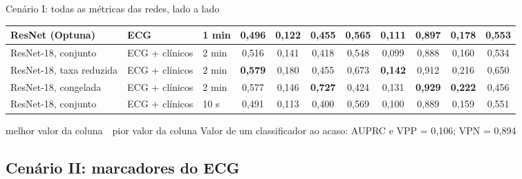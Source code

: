 \documentclass[10pt,aspectratio=169]{beamer}
\begin{document}
\begin{frame}{Cenário I: todas as métricas das redes, lado a lado}
{\begin{tabular}{lllcccccccc}
      ResNet (Optuna) & ECG & 1 min & 0,496 & 0,122 & 0,455 & 0,565 & 0,111 & 0,897 & 0,178 & 0,553 \\
      \midrule
      ResNet-18, conjunto & ECG + clínicos & 2 min & 0,516 & 0,141 & 0,418 & 0,548 & 0,099 & 0,888 & 0,160 & 0,534 \\
      ResNet-18, taxa reduzida & ECG + clínicos & 2 min & \cellcolor{melhor}\textbf{0,579} & 0,180 & 0,455 & 0,673 & \cellcolor{melhor}\textbf{0,142} & 0,912 & 0,216 & 0,650 \\
      ResNet-18, congelada & ECG + clínicos & 2 min & 0,577 & 0,146 & \cellcolor{melhor}\textbf{0,727} & 0,424 & 0,131 & \cellcolor{melhor}\textbf{0,929} & \cellcolor{melhor}\textbf{0,222} & 0,456 \\
      ResNet-18, conjunto & ECG + clínicos & 10 s & 0,491 & 0,113 & 0,400 & 0,569 & 0,100 & 0,889 & 0,159 & 0,551 \\
    \bottomrule
  \end{tabular}}
  \par\vspace{1pt}
  {\scriptsize\color{cinza}
  \colorbox{melhor}{melhor valor da coluna}\ \ \colorbox{pior}{pior valor da coluna}
  \qquad Valor de um classificador ao acaso: AUPRC e VPP = 0,106; VPN = 0,894}
\end{frame}


\subsection{Cenário II: marcadores do ECG}
\end{document}
